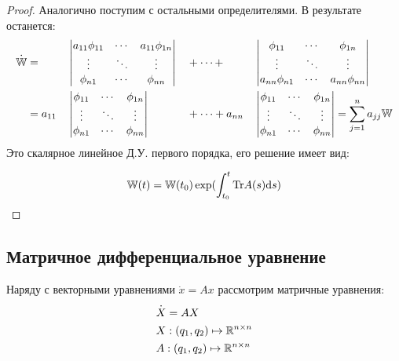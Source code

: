 \begin{proof}
Аналогично поступим с остальными определителями.
В результате останется:
$$\begin{aligned}
 \overset{\textbf .}{\mathbb W}  &=
&& \begin{vmatrix}
 a_{1 1} \phi_{1 1} & \cdots & a_{1 1} \phi_{1 n} \\
     \vdots & \ddots & \vdots \\
     \phi_{n 1} & \cdots & \phi_{n n}
    \end{vmatrix}
&& + \cdots +
&& \begin{vmatrix}
 \phi_{1 1} & \cdots & \phi_{1 n} \\
     \vdots     & \ddots & \vdots \\
     a_{n n} \phi_{n 1} & \cdots & a_{n n} \phi_{n n} 
    \end{vmatrix}\\
& =
a_{1 1} 
&& \begin{vmatrix}
 \phi_{1 1} & \cdots & \phi_{1 n} \\
     \vdots & \ddots & \vdots \\
     \phi_{n 1} & \cdots & \phi_{n n}
    \end{vmatrix}
&& + \cdots +
a_{n n} 
&& \begin{vmatrix}
 \phi_{1 1} & \cdots & \phi_{1 n} \\
       \vdots     & \ddots & \vdots \\
       \phi_{n 1} & \cdots & \phi_{n n}
      \end{vmatrix}
= \sum_{j=1}^n a_{j j} \mathbb W
\end{aligned}$$
Это скалярное линейное Д.У. первого порядка, его решение имеет вид:

$$\mathbb W(t) = \mathbb W(t_0) \exp(\int_{t_0}^t \mathrm{Tr} A(s) \mathrm{d} s)$$
\end{proof}

\subsection{Матричное дифференциальное
уравнение}\label{ux43cux430ux442ux440ux438ux447ux43dux43eux435-ux434ux438ux444ux444ux435ux440ux435ux43dux446ux438ux430ux43bux44cux43dux43eux435-ux443ux440ux430ux432ux43dux435ux43dux438ux435}

Наряду с векторными уравнениями \(\dot x = A x\) рассмотрим матричные
уравнения: \[\begin{aligned}
& \overset{\textbf .}{X} = A X \\
& X : (q_1, q_2) \mapsto \mathbb R^{n\times n} \\
& A : (q_1, q_2) \mapsto \mathbb R^{n\times n}
\end{aligned}\]

